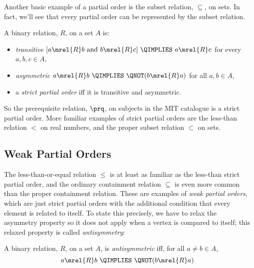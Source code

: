 Another basic example of a partial order is the subset relation,
$\subseteq$, on sets.  In fact, we'll see that every partial order can be
represented by the subset relation.

\begin{definition}
A binary relation, $R$, on a set $A$ is:
\begin{itemize}

\item \emph{transitive} \qiff 
$[a \mrel{R}  b \text{ and } b \mrel{R}  c]\ \QIMPLIES\  a \mrel{R}  c$
\quad for every $a,b,c\in A$,

\item \emph{asymmetric} \qiff
$a \mrel{R}  b\  \QIMPLIES\  \QNOT(b \mrel{R}  a)$
\quad for all $a,b\in A$,

\item a \emph{strict partial order} iff it is transitive and asymmetric.
\end{itemize}

\end{definition}

So the prerequisite relation, $\prq$, on subjects in the MIT catalogue is
a strict partial order.  More familiar examples of strict partial orders
are the less-than relation $<$ on real numbers, and the proper subset relation
$\subset$ on sets.
\fi

\subsection{Weak Partial Orders}
The less-than-or-equal relation $\leq$ is at least as familiar as
the less-than strict partial order, and the ordinary containment
relation $\subseteq$ is even more common than the proper containment
relation.  These are examples of \emph{weak partial orders},%
which are just strict partial orders with the additional condition that every
element is related to itself.  To state this precisely, we have to
relax the asymmetry property so it does not apply when a vertex is
compared to itself; this relaxed property%
 is called
\emph{antisymmetry}:

\begin{definition}\label{antis}
A binary relation, $R$, on a set $A$, is \emph{antisymmetric}%
iff, for all $a \neq b \in A$,
\[
a \mrel{R}  b\ \QIMPLIES\ \QNOT(b \mrel{R}  a)
\]
\end{definition}

